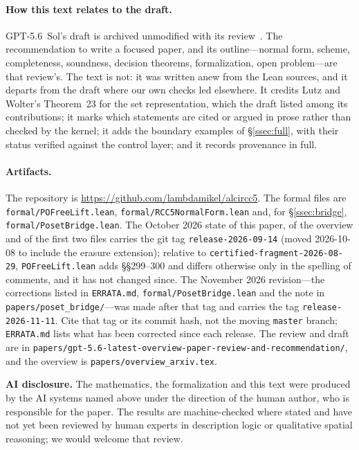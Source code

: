 \documentclass[11pt]{article}
\theoremstyle{plain}
\theoremstyle{definition}
\begin{document}
\paragraph{How this text relates to the draft.} GPT-5.6~Sol's draft is archived
unmodified with its review~\cite{GPT56SolReview}. The recommendation to write a
focused paper, and its outline---normal form, scheme, completeness, soundness,
decision theorems, formalization, open problem---are that review's. The text is
not: it was written anew from the Lean sources, and it departs from the draft
where our own checks led elsewhere. It credits Lutz and Wolter's Theorem~23 for
the set representation, which the draft listed among its contributions; it marks
which statements are cited or argued in prose rather than checked by the kernel;
it adds the boundary examples of \S\ref{ssec:full}, with their status verified
against the control layer; and it records provenance in full.

\paragraph{Artifacts.} The repository is
\url{https://github.com/lambdamikel/alcircc5}. The formal files are
\texttt{formal/POFreeLift.lean}, \texttt{formal/RCC5NormalForm.lean} and, for
\S\ref{ssec:bridge}, \texttt{formal/PosetBridge.lean}. The October 2026 state of
this paper, of the overview and of the first two files carries the git tag
\texttt{release-2026-09-14} (moved 2026-10-08 to include the erasure
extension); relative to \texttt{certified-fragment-2026-08-29},
\texttt{POFreeLift.lean} adds \S\S299--300 and differs otherwise only in the
spelling of comments, and it has not changed since. The November 2026
revision---the corrections listed in \texttt{ERRATA.md},
\texttt{formal/PosetBridge.lean} and the note in
\texttt{papers/poset\_bridge/}---was made after that tag and carries the tag
\texttt{release-2026-11-11}. Cite that tag or its commit hash, not the moving
\texttt{master} branch; \texttt{ERRATA.md} lists what has been corrected since
each release. The review and draft are in
\texttt{papers/gpt-5.6-latest-overview-paper-review-and-recommendation/}, and
the overview is \texttt{papers/overview\_arxiv.tex}.

\bigskip
\noindent\textbf{AI disclosure.} The mathematics, the formalization and this
text were produced by the AI systems named above under the direction of the
human author, who is responsible for the paper. The results are
machine-checked where stated and have not yet been reviewed by human experts in
description logic or qualitative spatial reasoning; we would welcome that
review.
\end{document}
